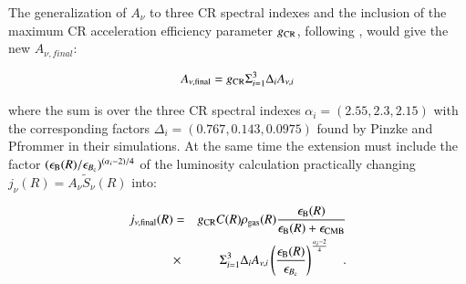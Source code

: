 \documentclass[traditabstract]{aa}
\begin{document}
\begin{appendix}
The generalization of $A_{\nu}$ to three CR spectral indexes and the inclusion of the maximum CR acceleration efficiency parameter $g_{\rm{CR}}$, following \cite{2010MNRAS.409..449P}, would give the new $A_{\nu, final}$:

\begin{equation}
A_{\nu, \rm{final}} = g_{\rm{CR}} \Sigma_{i=1}^{3} \Delta_{i} A_{\nu,i}
\end{equation}

where the sum is over the three CR spectral indexes $\alpha_{i}=(2.55,2.3,2.15)$ with the corresponding factors $\Delta_{i} = (0.767, 0.143, 0.0975)$ found by Pinzke and Pfrommer in their simulations. At the same time the extension must include the factor $(\epsilon_{\rm{B}}(R)/\epsilon_{B_{\rm{c}}})^{(\alpha_{i}-2)/4}$ of the luminosity calculation practically changing $j_{\nu}(R)=A_{\nu}\tilde{S}_{\nu}(R)$ into: 

\begin{eqnarray}
j_{\nu,\rm{final}}(R) & = &g_{\rm{CR}} C(R) \rho_{\rm{gas}}(R) \frac{\epsilon_{\rm{B}}(R)}{\epsilon_{\rm{B}}(R)+\epsilon_{\rm{CMB}}} \nonumber \\
& \times & \Sigma_{i=1}^{3} \Delta_{i} A_{\nu,i} \left( \frac{\epsilon_{\rm{B}}(R)}{\epsilon_{B_{\rm{c}}}} \right)^{\frac{\alpha_{i}-2}{4}}  \quad .
\end{eqnarray}
 
\end{appendix}
\end{document}

